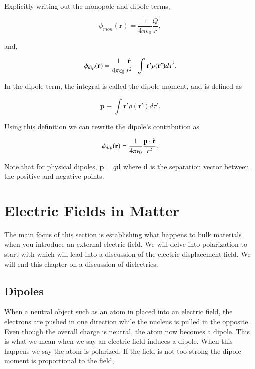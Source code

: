 \documentclass[preprint, review,12pt]{elsarticle}
\def\k{\frac{1}{4 \pi \epsilon_0}}
\def\.{\cdot}
\def\b{\textbf}
\def\={\equiv}
\newcommand{\hb}[1]{\hat{\b #1}}
\begin{document}
Explicitly writing out the monopole and dipole terms,

\begin{equation}
    \phi_{mon}(\b{r}) = \k \frac{Q}{r},
\end{equation}

and,

\begin{equation}
    \phi_{dip}(\b{r}) = \k\frac{\hb{r}}{r^2} \. \int \b{r'}\rho(\b{r'})d\tau'.
\end{equation}

In the dipole term, the integral is called the dipole moment, and is defined as

\begin{equation}
    \b{p} \= \int\b{r'} \rho(\b{r'})d\tau'.
\end{equation}

Using this definition we can rewrite the dipole's contribution as

\begin{equation}
    \phi_{dip}(\b{r}) = \k\frac{\b{p}\. \hb{r}}{r^2}.
\end{equation}

Note that for physical dipoles, $\b{p} = q\b{d}$ where $\b{d}$ is the separation vector between the positive and negative points.

\section{Electric Fields in Matter}

The main focus of this section is establishing what happens to bulk materials when you introduce an external electric field. We will delve into polarization to start with which will lead into a discussion of the electric displacement field. We will end this chapter on a discussion of dielectrics.

\subsection{Dipoles}

When a neutral object such as an atom in placed into an electric field, the electrons are pushed in one direction while the nucleus is pulled in the opposite. Even though the overall charge is neutral, the atom now becomes a dipole. This is what we mean when we say an electric field induces a dipole. When this happens we say the atom is polarized. If the field is not too strong the dipole moment is proportional to the field,
\end{document}
